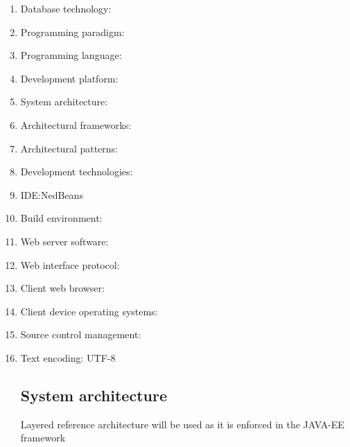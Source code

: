  
%

	\begin{enumerate}
		\item Database technology: 
		\item Programming paradigm: 
		\item Programming language: 
		\item Development platform:  
		\item System architecture: 
		\item Architectural frameworks: 
		\item Architectural patterns: 
		\item Development technologies:
		\item IDE:NedBeans
		\item Build environment:
		\item Web server software:
		\item Web interface protocol:
		\item Client web browser:
		\item Client device operating systems:
		\item Source control management: 
		\item Text encoding: UTF-8
		
		
			\subsection{System architecture}
				Layered reference architecture will be used as it is enforced in the JAVA-EE framework
				
				
		
					
				
				
	\end{enumerate}

%
